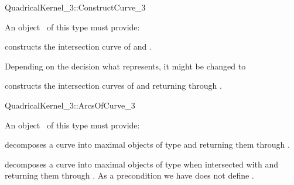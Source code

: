 \begin{ccRefFunctionObjectConcept}{QuadricalKernel_3::ConstructCurve_3}


An object \ccVar\ of this type must provide:

{constructs the intersection curve of  and .}

\begin{ccAdvanced}

Depending on the decision what  represents,
it might be changed to 

{constructs the intersection curves of  and  returning through
  .}

\end{ccAdvanced}


\end{ccRefFunctionObjectConcept}


\begin{ccRefFunctionObjectConcept}{QuadricalKernel_3::ArcsOfCurve_3}



An object \ccVar\ of this type must provide:

{decomposes a curve into maximal objects of type 
 and returning them through .}

{decomposes a curve into maximal objects of type 
 when intersected with  
and returning them through . As a precondition we have  does
not define .}

\end{ccRefFunctionObjectConcept}


